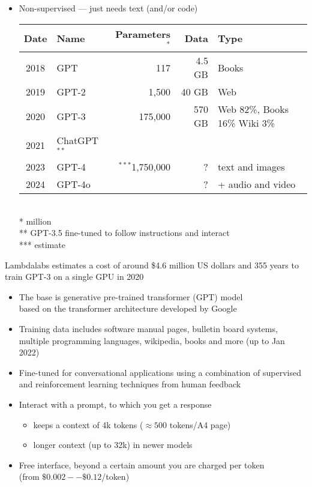 \documentclass[25pt,a4paper,landscape,headrule,footrule,xetex]{foils}
\begin{document}
\begin{itemize}
\item Non-supervised --- just needs text (and/or code)
  \\[3ex]
  \begin{small}

  \begin{tabular}{clrrl}
    Date & Name & Parameters$^{*}$ & Data & Type \\ \hline
    2018 &  GPT &  117 &  4.5 GB &  Books \\
    2019 &  GPT-2 & 1,500  &  40 GB & Web \\
    2020 &  GPT-3 &  175,000 &  570 GB &
      Web 82\%, Books 16\%  Wiki 3\% \\ 
    2021 & ChatGPT$^{**}$ \\
    2023 & GPT-4 & {$^{***}$}1,750,000 & ? &  text and images\\
    2024 & GPT-4o & & ? & +  audio and video 

  \end{tabular}
  \\ {*} million
  \\ {**}  GPT-3.5 fine-tuned to follow instructions and interact
  \\ {***} estimate
    
  \end{small}
\end{itemize}

Lambdalabs estimates a cost of around \$4.6 million US dollars and 355 years to train GPT-3 on a single GPU in 2020


\begin{itemize}
\item The base is generative pre-trained transformer (GPT) model
  \\ based on the transformer architecture developed by Google
\item Training data includes software manual pages, bulletin board systems, multiple programming languages, wikipedia, books and more (up to Jan 2022)
  \item Fine-tuned for conversational applications using a combination
  of supervised and reinforcement learning techniques from human feedback
\item Interact with a prompt, to which you get a response
  \begin{itemize}
  \item  keeps a context of 4k tokens ($\approx 500$ tokens/A4 page)
  \item  longer context (up to 32k) in newer models
  \end{itemize}
\item Free interface, beyond a certain amount you are charged per
  token
  \\ (from   $\$0.002--\$0.12$/token)        
  
\end{itemize}
\end{document}
